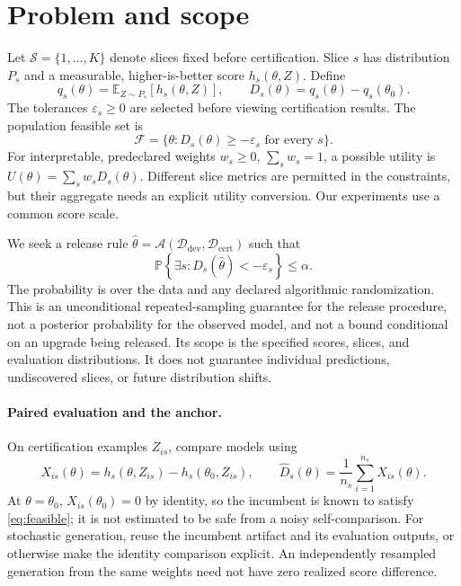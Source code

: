 \documentclass[11pt,letterpaper]{article}
\newcommand{\E}{\mathbb{E}}
\newcommand{\Prb}{\mathbb{P}}
\newcommand{\old}{\theta_0}
\newcommand{\eps}{\varepsilon}
\newcommand{\calD}{\mathcal{D}}
\begin{document}
\section{Problem and scope}
\label{sec:problem}
Let $\mathcal{S}=\{1,\ldots,K\}$ denote slices fixed before certification. Slice $s$ has distribution $P_s$ and a measurable, higher-is-better score $h_s(\theta,Z)$. Define
\begin{equation}
q_s(\theta)=\E_{Z\sim P_s}[h_s(\theta,Z)],\qquad
D_s(\theta)=q_s(\theta)-q_s(\old).
\end{equation}
The tolerances $\eps_s\geq0$ are selected before viewing certification results. The population feasible set is
\begin{equation}
\mathcal F=\{\theta:D_s(\theta)\geq-\eps_s\text{ for every }s\}.
\label{eq:feasible}
\end{equation}
For interpretable, predeclared weights $w_s\geq0$, $\sum_s w_s=1$, a possible utility is $U(\theta)=\sum_s w_sD_s(\theta)$. Different slice metrics are permitted in the constraints, but their aggregate needs an explicit utility conversion. Our experiments use a common score scale.

We seek a release rule $\widehat\theta=\mathcal A(\calD_{\mathrm{dev}},\calD_{\mathrm{cert}})$ such that
\begin{equation}
\Prb\left\{\exists s:D_s(\widehat\theta)<-\eps_s\right\}\leq\alpha.
\label{eq:guarantee}
\end{equation}
The probability is over the data and any declared algorithmic randomization. This is an unconditional repeated-sampling guarantee for the release procedure, not a posterior probability for the observed model, and not a bound conditional on an upgrade being released. Its scope is the specified scores, slices, and evaluation distributions. It does not guarantee individual predictions, undiscovered slices, or future distribution shifts.

\paragraph{Paired evaluation and the anchor.}
On certification examples $Z_{is}$, compare models using
\begin{equation}
X_{is}(\theta)=h_s(\theta,Z_{is})-h_s(\old,Z_{is}),\qquad
\widehat D_s(\theta)=\frac1{n_s}\sum_{i=1}^{n_s}X_{is}(\theta).
\label{eq:paired}
\end{equation}
At $\theta=\old$, $X_{is}(\old)=0$ by identity, so the incumbent is known to satisfy \eqref{eq:feasible}; it is not estimated to be safe from a noisy self-comparison. For stochastic generation, reuse the incumbent artifact and its evaluation outputs, or otherwise make the identity comparison explicit. An independently resampled generation from the same weights need not have zero realized score difference.
\end{document}
